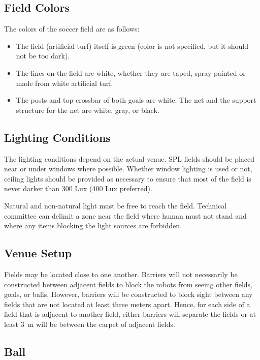 \subsection{Field Colors}
\label{sec:field_colors}

The colors of the soccer field are as follows:
\begin{itemize}
  \item The field (artificial turf) itself is green (color is not specified, but it should not be too dark).
  \item The lines on the field are white, whether they are taped, spray painted or made from white artificial turf.
  \item The posts and top crossbar of both goals are white.
    The net and the support structure for the net are white, gray, or black.
\end{itemize}

\subsection{Lighting Conditions}
\label{sec:lightConditions}

The lighting conditions depend on the actual venue.
SPL fields should be placed near or under windows where possible.
Whether window lighting is used or not, ceiling lights should be provided as necessary to ensure that most of the field is never darker than 300 Lux (400 Lux preferred).

Natural and non-natural light must be free to reach the field.
Technical committee can delimit a zone near the field where human must not stand and where any items blocking the light sources are forbidden. 

\subsection{Venue Setup}
\label{sec:boundaries}

Fields may be located close to one another.
Barriers will not necessarily be constructed between adjacent fields to block the robots from seeing other fields, goals, or balls.
However, barriers will be constructed to block sight between any fields that are not located at least three meters apart.
Hence, for each side of a field that is adjacent to another field, either barriers will separate the fields or at least \qty{3}{\metre} will be between the carpet of adjacent fields.

\subsection{Ball}
\label{sec:ball}


